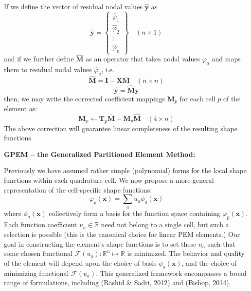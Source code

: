 \documentclass[11pt]{article} %
\begin{document}
If we define the vector of residual nodal values $\hat{\mathbf{y}}$ as
\begin{equation}
	\hat{\mathbf{y}} = \left\{ \begin{array}{c} \hat{\varphi}_1 \\ \hat{\varphi}_2 \\ \vdots \\ \hat{\varphi}_n \end{array} \right\} \quad (n \times 1)
\end{equation}
and if we further define $\hat{\mathbf{M}}$ as an operator that takes nodal values $\varphi_a$ and maps them to residual nodal values $\hat{\varphi}_a$, i.e.
\begin{equation}
	\hat{\mathbf{M}} = \mathbf{I} - \mathbf{X} \bar{\mathbf{M}} \quad (n \times n)
\end{equation}
\begin{equation}
	\hat{\mathbf{y}} = \hat{\mathbf{M}} \mathbf{y}
\end{equation}
then, we may write the corrected coefficient mappings $\mathbf{M}_p$ for each cell $p$ of the element as:
\begin{equation}
	\mathbf{M}_p \leftarrow \mathbf{T}_p \bar{\mathbf{M}} + \mathbf{M}_p \hat{\mathbf{M}} \quad (4 \times n)
\end{equation}
The above correction will guarantee linear completeness of the resulting shape functions.

\newpage

\begin{center}
\textbf{GPEM -- the Generalized Partitioned Element Method:}
\end{center}

Previously we have assumed rather simple (polynomial) forms for the local shape functions within each quadrature cell. We now propose a more general representation of the cell-specific shape functions:
\begin{equation}
	\varphi_p (\mathbf{x}) = \sum_a u_a \phi_a (\mathbf{x})
\end{equation}
where $\phi_a (\mathbf{x})$ collectively form a basis for the function space containing $\varphi_p (\mathbf{x})$. Each function coefficient $u_a \in \mathbb{R}$ need not belong to a single cell, but such a selection is possible (this is the canonical choice for linear PEM elements.) Our goal in constructing the element's shape functions is to set these $u_a$ such that some chosen functional $\mathcal{F} (u_a) \colon \mathbb{R}^n \mapsto \mathbb{R}$ is minimized. The behavior and quality of the element will depend upon the choice of basis $\phi_a (\mathbf{x})$, and the choice of minimizing functional $\mathcal{F} (u_a)$. This generalized framework encompasses a broad range of formulations, including (Rashid \& Sadri, 2012) and (Bishop, 2014).
\end{document}
